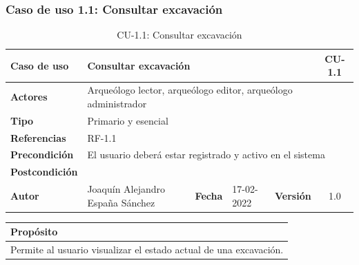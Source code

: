 \subsubsection{Caso de uso 1.1: Consultar excavación}

    \begin{table}[H]
    \begin{center}
        \begin{adjustbox}{width=\textwidth}
        \begin{tabular}{ | l | l | l | l | c | c | } 
            \hline
            \textbf{Caso de uso} & \multicolumn{4}{l|}{Consultar excavación} & \cellcolor{gray!50} \textbf{CU-1.1}\\
            \hline
            \textbf{Actores} & \multicolumn{5}{p{0.5\linewidth}|}{Arqueólogo lector, arqueólogo editor, arqueólogo administrador} \\
            \hline
            \textbf{Tipo} & \multicolumn{5}{l|}{Primario y esencial} \\
            \hline
            \textbf{Referencias} & \multicolumn{3}{l|}{RF-1.1} & \multicolumn{2}{l|}{ }\\
            \hline
            \textbf{Precondición} & \multicolumn{5}{l|}{El usuario deberá estar registrado y activo en el sistema} \\
            \hline
            \textbf{Postcondición} & \multicolumn{5}{l|}{ } \\
            \hline
            \textbf{Autor} & \multicolumn{1}{p{0.25\linewidth}|}{Joaquín Alejandro España Sánchez} & \textbf{Fecha} & 
            17-02-2022     & \textbf{Versión}                                                      & 1.0\\
            \hline
        \end{tabular}
        \end{adjustbox}
        \caption{CU-1.1: Consultar excavación}
        \label{tab:consult-excavation}
    \end{center}
    \end{table}
    
    \begin{table}[H]
        \centering
        \begin{tabularx}{\textwidth}{@{} |L |@{}} \hline
            \textbf{Propósito} \\
            \hline
            Permite al usuario visualizar el estado actual de una excavación. \\
            \hline
        \end{tabularx}
    \end{table}

